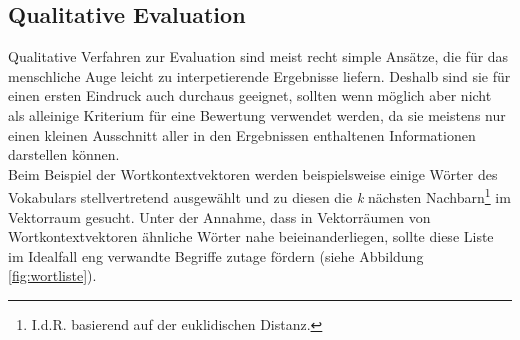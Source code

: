   \subsection{Qualitative Evaluation}

  Qualitative Verfahren zur Evaluation sind meist recht simple Ansätze, die für das menschliche
  Auge leicht zu interpetierende Ergebnisse liefern. Deshalb sind sie für einen ersten Eindruck
  auch durchaus geeignet, sollten wenn möglich aber nicht als alleinige Kriterium für eine Bewertung
  verwendet werden, da sie meistens nur einen kleinen Ausschnitt aller in den Ergebnissen enthaltenen
  Informationen darstellen können. \\
  Beim Beispiel der Wortkontextvektoren werden beispielsweise einige Wörter des Vokabulars stellvertretend ausgewählt
  und zu diesen die \emph{k} nächsten Nachbarn\footnote{I.d.R. basierend auf der euklidischen Distanz.} im Vektorraum gesucht.
  Unter der Annahme, dass in Vektorräumen von Wortkontextvektoren ähnliche Wörter nahe beieinanderliegen, sollte diese Liste
  im Idealfall eng verwandte Begriffe zutage fördern (siehe Abbildung \ref{fig:wortliste}).\\

